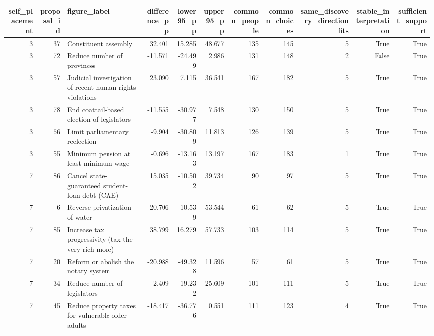 \begin{tabular}{rrlrrrrrrrr}
\toprule
self\_placement & proposal\_id & figure\_label & difference\_pp & lower95\_pp & upper95\_pp & common\_people & common\_choices & same\_discovery\_direction\_fits & stable\_interpretation & sufficient\_support \\
\midrule
3 & 37 & Constituent assembly & 32.401 & 15.285 & 48.677 & 135 & 145 & 5 & True & True \\
3 & 72 & Reduce number of provinces & -11.571 & -24.499 & 2.986 & 131 & 148 & 2 & False & True \\
3 & 57 & Judicial investigation of recent human-rights violations & 23.090 & 7.115 & 36.541 & 167 & 182 & 5 & True & True \\
3 & 78 & End coattail-based election of legislators & -11.555 & -30.977 & 7.548 & 130 & 150 & 5 & True & True \\
3 & 66 & Limit parliamentary reelection & -9.904 & -30.809 & 11.813 & 126 & 139 & 5 & True & True \\
3 & 55 & Minimum pension at least minimum wage & -0.696 & -13.163 & 13.197 & 167 & 183 & 1 & True & True \\
7 & 86 & Cancel state-guaranteed student-loan debt (CAE) & 15.035 & -10.502 & 39.734 & 90 & 97 & 5 & True & True \\
7 & 6 & Reverse privatization of water & 20.706 & -10.539 & 53.544 & 61 & 62 & 5 & True & True \\
7 & 85 & Increase tax progressivity (tax the very rich more) & 38.799 & 16.279 & 57.733 & 103 & 114 & 5 & True & True \\
7 & 20 & Reform or abolish the notary system & -20.988 & -49.328 & 11.596 & 57 & 61 & 5 & True & True \\
7 & 34 & Reduce number of legislators & 2.409 & -19.232 & 25.609 & 101 & 111 & 5 & True & True \\
7 & 45 & Reduce property taxes for vulnerable older adults & -18.417 & -36.776 & 0.551 & 111 & 123 & 4 & True & True \\
\bottomrule
\end{tabular}
